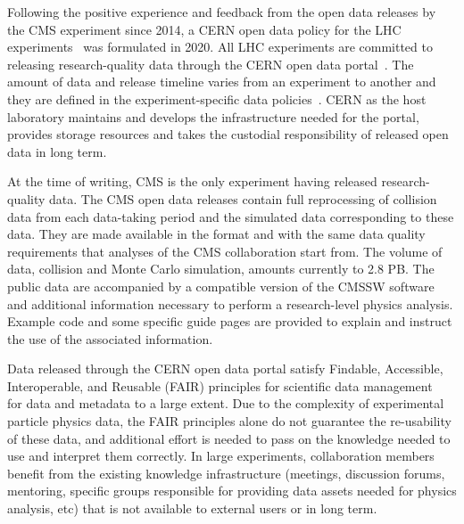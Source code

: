 \documentclass[11pt]{article}
\begin{document}


Following the positive experience and feedback from the open data releases by the CMS experiment since 2014, a CERN open data policy for the LHC experiments~\cite{cern-data-policy} was formulated in 2020. All LHC experiments are committed to releasing research-quality data through the CERN open data portal~\cite{CODP}. The amount of data and release timeline varies from an experiment to another and they are defined in the experiment-specific data policies~\cite{cern-data-policy,cern-open-data-privacy-policy,cms-open-data-policy,atlas-open-data-policy,lhcb-open-data-policy,alice-open-data-policy}. CERN as the host laboratory maintains and develops the infrastructure needed for the portal, provides storage resources and takes the custodial responsibility of released open data in long term. 

At the time of writing, CMS is the only experiment having released research-quality data. The CMS open data releases contain full reprocessing of collision data from each data-taking period and the simulated data corresponding to these data. They are made available in the format and with the same data quality requirements that analyses of the CMS collaboration start from. The volume of data, collision and Monte Carlo simulation, amounts currently to 2.8 PB. The public data are accompanied by a compatible version of the CMSSW software and additional information necessary to perform a research-level physics analysis. Example code and some specific guide pages are provided to explain and instruct the use of the associated information.

Data released through the CERN open data portal satisfy Findable, Accessible, Interoperable, and Reusable (FAIR) principles for scientific data management~\cite{FAIR-paper} for data and metadata to a large extent. Due to the complexity of experimental particle physics data, the FAIR principles alone do not guarantee the re-usability of these data, and additional effort is needed to pass on the knowledge needed to use and interpret them correctly. In large experiments, collaboration members benefit from the existing knowledge infrastructure (meetings, discussion forums, mentoring, specific groups responsible for providing data assets needed for physics analysis, etc) that is not available to external users or in long term. 
\end{document}
